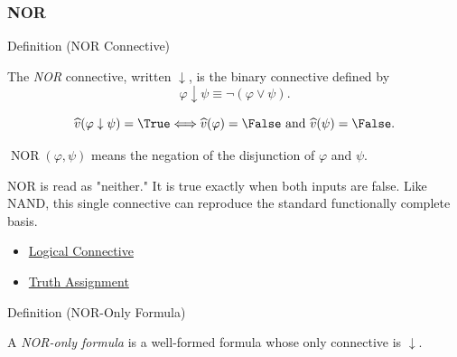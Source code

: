 \subsubsection*{NOR}

\begin{definitionbox}{Definition (NOR Connective)}
\begin{definition}
\label{def:nor-connective-propositional-logic}
The \emph{NOR} connective, written \(\downarrow\), is the binary connective
defined by
\[
\varphi\downarrow\psi\equiv\neg(\varphi\lor\psi).
\]
\end{definition}
\end{definitionbox}

\begin{remark*}
\[
\widehat v(\varphi\downarrow\psi)=\True
\Longleftrightarrow
\widehat v(\varphi)=\False\text{ and }\widehat v(\psi)=\False.
\]
\end{remark*}

\begin{remark*}
\(\operatorname{NOR}(\varphi,\psi)\) means the negation of the disjunction of
\(\varphi\) and \(\psi\).
\end{remark*}

\begin{remark*}[Interpretation]
NOR is read as "neither." It is true exactly when both inputs are false. Like
NAND, this single connective can reproduce the standard functionally complete
basis.
\end{remark*}

\begin{dependencies}
\begin{itemize}
  \item \hyperref[def:logical-connective]{Logical Connective}
  \item \hyperref[def:truth-assignment-propositional-logic]{Truth Assignment}
\end{itemize}
\end{dependencies}

\begin{definitionbox}{Definition (NOR-Only Formula)}
\begin{definition}
\label{def:nor-only-formula-propositional-logic}
A \emph{NOR-only formula} is a well-formed formula whose only connective is
\(\downarrow\).
\end{definition}
\end{definitionbox}

